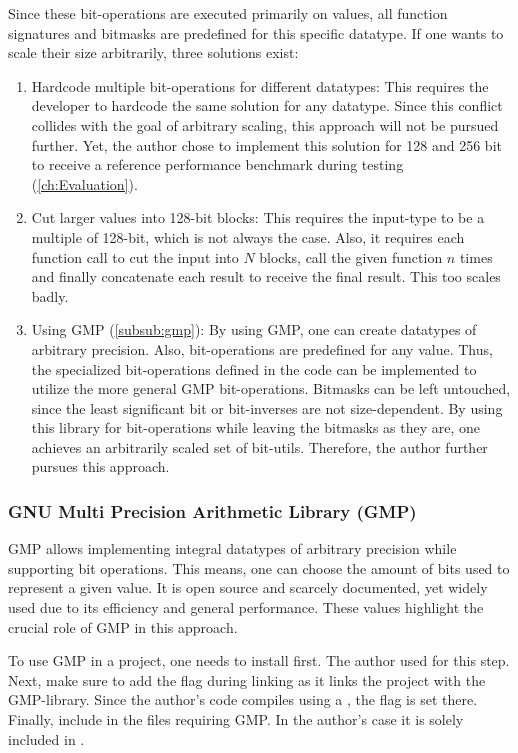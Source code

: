 Since these bit-operations are executed primarily on  values, all function signatures and bitmasks are predefined for this specific datatype.
If one wants to scale their size arbitrarily, three solutions exist:
\begin{enumerate}
    \item Hardcode multiple bit-operations for different datatypes:
    This requires the developer to hardcode the same solution for any datatype.
    Since this conflict collides with the goal of arbitrary scaling, this approach will not be pursued further.
    Yet, the author chose to implement this solution for 128 and 256 bit to receive a reference performance benchmark during testing (\ref{ch:Evaluation}).
    \item Cut larger values into 128-bit blocks:
    This requires the input-type to be a multiple of 128-bit, which is not always the case.
    Also, it requires each function call to cut the input into $N$ blocks, call the given function $n$ times and finally concatenate each result to receive the final result.
    This too scales badly.
    \item Using GMP (\ref{subsub:gmp}):
    By using GMP, one can create datatypes of arbitrary precision.
    Also, bit-operations are predefined for any  value.
    Thus, the specialized bit-operations defined in the code can be implemented to utilize the more general GMP bit-operations.
    Bitmasks can be left untouched, since the least significant bit or bit-inverses are not size-dependent.
    By using this library for bit-operations while leaving the bitmasks as they are, one achieves an arbitrarily scaled set of bit-utils.
    Therefore, the author further pursues this approach.
\end{enumerate}

\subsubsection*{GNU Multi Precision Arithmetic Library (GMP)} \label{subsub:gmp}
GMP allows implementing integral datatypes of arbitrary precision while supporting bit operations.
This means, one can choose the amount of bits used to represent a given value.
It is open source and scarcely documented, yet widely used due to its efficiency and general performance.
These values highlight the crucial role of GMP in this approach.

To use GMP in a project, one needs to install  first.
The author used  for this step.
Next, make sure to add the  flag during linking as it links the project with the GMP-library.
Since the author's code compiles using a , the flag is set there.
Finally, include  in the files requiring GMP.
In the author's case it is solely included in .

